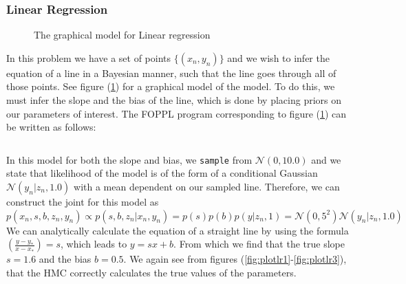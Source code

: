 \documentclass[twoside]{article}
\begin{document}
\subsubsection{Linear Regression}
\begin{figure}[ht]
	\begin{center}
		
	\end{center}
	\caption{The graphical model for Linear regression}
    \label{fig:lrgraph}
\end{figure}
In this problem we have a set of points $\{(x_{n},y_{n})\}$ and we wish to infer the equation of a line in a Bayesian manner, such that the line goes through all of those points. See figure (\ref{fig:lrgraph}) for a graphical model of the model. To do this, we must infer the slope and the bias of the line, which is done by placing priors on our parameters of interest. The FOPPL program corresponding to figure (\ref{fig:lrgraph}) can be written as follows:\inputminted{clojure}{code/linearregression.clj}In this model for both the slope and bias, we \texttt{sample} from $\mathcal{N}(0,10.0)$ and we state that likelihood of the model is of the form of a conditional Gaussian $\mathcal{N}(y_{n}| z_{n}, 1.0)$ with a mean dependent on our sampled line. Therefore, we can construct the joint for this model as $p(x_{n},s,b,z_{n}, y_{n}) \propto p(s,b,z_{n} | x_{n}, y_{n}) = p(s)p(b)p(y | z_{n}, 1) =\mathcal{N}(0,5^{2})\mathcal{N}(y_{n}|z_{n},1.0)$ We can analytically calculate the equation of a straight line by using the formula $\left(\frac{y - y_{*}}{x - x_{*}}\right) = s$, which leads to $y = sx + b$. From which we find that the true slope $s = 1.6$ and the bias $b = 0.5$. We again see from figures (\ref{fig:plotlr1}-\ref{fig:plotlr3}), that the HMC correctly calculates the true values of the parameters.\\
\end{document}
